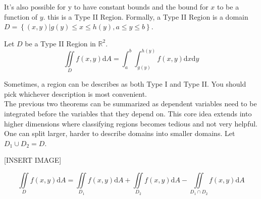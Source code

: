 \noindent
It's also possible for y to have constant bounds and the bound for $x$ to be a function of $y$. this is a Type II Region. Formally, a Type II Region is a domain $D=\left\{(x,y)|g(y)\leq x\leq h(y), a\leq y\leq b\right\}$.

\begin{theorem}
	Let $D$ be a Type II Region in $\mathbb{R}^2$.\\
	$$\iint\limits_{D}{f(x,y)\mathrm{d}A}=\int_{a}^{b}{\int_{g(y)}^{h(y)}{f(x,y)\mathrm{d}x}\mathrm{d}y}$$
\end{theorem}

\noindent
Sometimes, a region can be describes as both Type I and Type II. You should pick whichever description is most convenient.\\

\noindent
The previous two theorems can be summarized as dependent variables need to be integrated before the variables that they depend on. This core idea extends into higher dimensions where classifying regions becomes tedious and not very helpful.\\

\noindent
One can split larger, harder to describe domains into smaller domains. Let $D_1\cup D_2=D$.

[INSERT IMAGE]

$$\iint\limits_{D}{f(x,y)\mathrm{d}A}=\iint\limits_{D_1}{f(x,y)\mathrm{d}A}+\iint\limits_{D_2}{f(x,y)\mathrm{d}A}-\iint\limits_{D_1\cap D_2}{f(x,y)\mathrm{d}A}$$